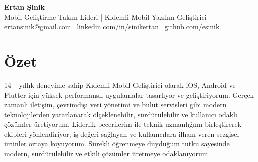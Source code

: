 \documentclass[10pt,a4paper]{extarticle}
\begin{document}
\begin{center}
    \begin{minipage}{\textwidth}
        \centering
        {\Huge\textbf{Ertan Şinik}}\\[5pt]
		{\Large Mobil Geliştirme Takım Lideri | Kıdemli Mobil Yazılım Geliştirici}\\[5pt]
        \href{mailto:ertansinik@gmail.com}{ertansinik@gmail.com} \textbullet\
        \href{https://linkedin.com/in/sinikertan}{linkedin.com/in/sinikertan} \textbullet\
        \href{https://github.com/esinik}{github.com/esinik}
    \end{minipage}
\end{center}
\section{Özet}
14+ yıllık deneyime sahip Kıdemli Mobil Geliştirici olarak iOS, Android ve Flutter için yüksek performanslı uygulamalar tasarlıyor ve geliştiriyorum. Gerçek zamanlı iletişim, çevrimdışı veri yönetimi ve bulut servisleri gibi modern teknolojilerden yararlanarak ölçeklenebilir, sürdürülebilir ve kullanıcı odaklı çözümler üretiyorum. Liderlik becerilerim ile teknik uzmanlığımı birleştirerek ekipleri yönlendiriyor, iş değeri sağlayan ve kullanıcılara ilham veren sezgisel ürünler ortaya koyuyorum. Sürekli öğrenmeye duyduğum tutku sayesinde modern, sürdürülebilir ve etkili çözümler üretmeye odaklanıyorum.
\end{document}
